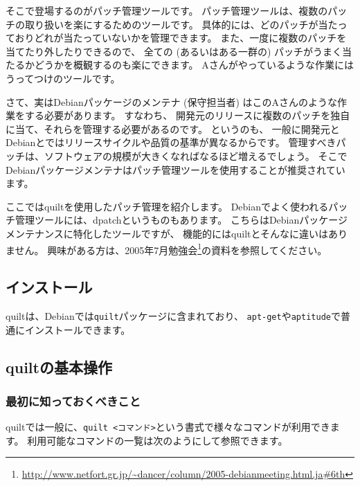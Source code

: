 \documentclass[mingoth,a4paper]{jsarticle}
\begin{document}
そこで登場するのがパッチ管理ツールです。
パッチ管理ツールは、複数のパッチの取り扱いを楽にするためのツールです。
具体的には、どのパッチが当たっておりどれが当たっていないかを管理できます。
また、一度に複数のパッチを当てたり外したりできるので、
全ての (あるいはある一群の) パッチがうまく当たるかどうかを概観するのも楽にできます。
Aさんがやっているような作業にはうってつけのツールです。

さて、実はDebianパッケージのメンテナ (保守担当者) はこのAさんのような作業をする必要があります。
すなわち、
開発元のリリースに複数のパッチを独自に当て、それらを管理する必要があるのです。
というのも、
一般に開発元とDebianとではリリースサイクルや品質の基準が異なるからです。
管理すべきパッチは、ソフトウェアの規模が大きくなればなるほど増えるでしょう。
そこでDebianパッケージメンテナはパッチ管理ツールを使用することが推奨されています。

ここではquiltを使用したパッチ管理を紹介します。
Debianでよく使われるパッチ管理ツールには、dpatchというものもあります。
こちらはDebianパッケージメンテナンスに特化したツールですが、
機能的にはquiltとそんなに違いはありません。
興味がある方は、2005年7月勉強会\footnote{\url{http://www.netfort.gr.jp/~dancer/column/2005-debianmeeting.html.ja\#6th}}の資料を参照してください。

\subsection{インストール}

quiltは、Debianでは\texttt{quilt}パッケージに含まれており、
\texttt{apt-get}や\texttt{aptitude}で普通にインストールできます。

\subsection{quiltの基本操作}

\subsubsection{最初に知っておくべきこと}

quiltでは一般に、\texttt{quilt <コマンド>}という書式で様々なコマンドが利用できます。
利用可能なコマンドの一覧は次のようにして参照できます。
\end{document}
